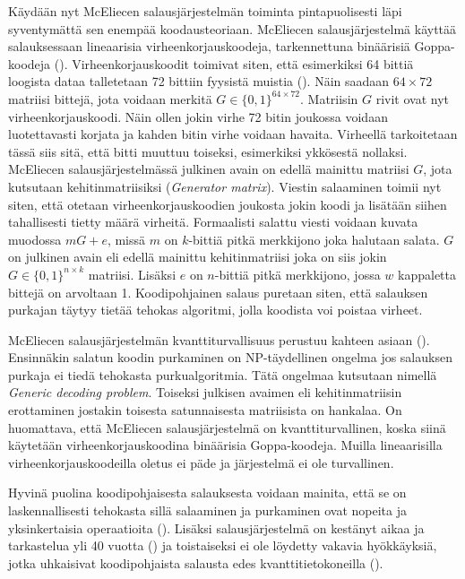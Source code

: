 Käydään nyt McEliecen salausjärjestelmän toiminta pintapuolisesti läpi syventymättä sen enempää koodausteoriaan. McEliecen salausjärjestelmä käyttää salauksessaan lineaarisia virheenkorjauskoodeja, tarkennettuna binäärisiä Goppa-koodeja (\cite{8012331}). Virheenkorjauskoodit toimivat siten, että esimerkiksi 64 bittiä loogista dataa talletetaan 72 bittiin fyysistä muistia (\cite{overbeck2009code}). Näin saadaan $64 \times 72$ matriisi bittejä, jota voidaan merkitä $G \in \{0, 1\}^{64 \times 72}$. Matriisin $G$ rivit ovat nyt virheenkorjauskoodi. Näin ollen jokin virhe 72 bitin joukossa voidaan luotettavasti korjata ja kahden bitin virhe voidaan havaita. Virheellä tarkoitetaan tässä siis sitä, että bitti muuttuu toiseksi, esimerkiksi ykkösestä nollaksi. McEliecen salausjärjestelmässä julkinen avain on edellä mainittu matriisi $G$, jota kutsutaan kehitinmatriisiksi (\emph{Generator matrix}). Viestin salaaminen toimii nyt siten, että otetaan virheenkorjauskoodien joukosta jokin koodi ja lisätään siihen tahallisesti tietty määrä virheitä. Formaalisti salattu viesti voidaan kuvata muodossa $mG+e$, missä $m$ on $k$-bittiä pitkä merkkijono joka halutaan salata. $G$ on julkinen avain eli edellä mainittu kehitinmatriisi joka on siis jokin $G \in \{0, 1\}^{n \times k}$ matriisi. Lisäksi $e$ on $n$-bittiä pitkä merkkijono, jossa $w$ kappaletta bittejä on arvoltaan 1. Koodipohjainen salaus puretaan siten, että salauksen purkajan täytyy tietää tehokas algoritmi, jolla koodista voi poistaa virheet.

McEliecen salausjärjestelmän kvanttiturvallisuus perustuu kahteen asiaan (\cite{8012331}). Ensinnäkin salatun koodin purkaminen on NP-täydellinen ongelma jos salauksen purkaja ei tiedä tehokasta purkualgoritmia. Tätä ongelmaa kutsutaan nimellä \emph{Generic decoding problem}. Toiseksi julkisen avaimen eli kehitinmatriisin erottaminen jostakin toisesta satunnaisesta matriisista on hankalaa. On huomattava, että McEliecen salausjärjestelmä on kvanttiturvallinen, koska siinä käytetään virheenkorjauskoodina binäärisia Goppa-koodeja. Muilla lineaarisilla virheenkorjauskoodeilla oletus ei päde ja järjestelmä ei ole turvallinen.

Hyvinä puolina koodipohjaisesta salauksesta voidaan mainita, että se on laskennallisesti tehokasta sillä salaaminen ja purkaminen ovat nopeita ja yksinkertaisia operaatioita (\cite{overbeck2009code}). Lisäksi salausjärjestelmä on kestänyt aikaa ja tarkastelua yli 40 vuotta (\cite{8012331}) ja toistaiseksi ei ole löydetty vakavia hyökkäyksiä, jotka uhkaisivat koodipohjaista salausta edes kvanttitietokoneilla (\cite{overbeck2009code}).

